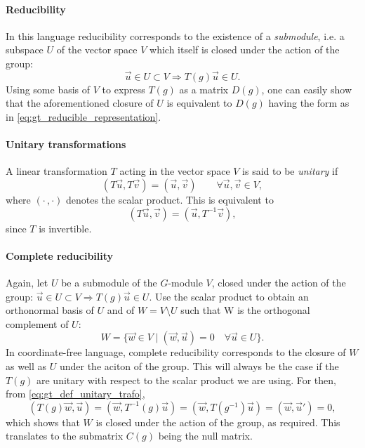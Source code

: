 \documentclass[../../main.tex]{subfiles}
\begin{document}
\paragraph{Reducibility}
In this language reducibility corresponds to the existence of a \emph{submodule}, i.e. a subspace $U$ of the vector space $V$ which itself is closed under the action of the group:
\begin{equation}
    \vec u \in U \subset V \Rightarrow T(g)\vec u \in U .
\end{equation}
Using some basis of $V$ to express $T(g)$ as a matrix $D(g)$, one can easily show that the aforementioned closure of $U$ is equivalent to $D(g)$ having the form as in \cref{eq:gt_reducible_representation}.

\paragraph{Unitary transformations}
A linear transformation $T$ acting in the vector space $V$ is said to be \emph{unitary} if
\begin{equation}
    (T\vec u, T \vec v) = (\vec u, \vec v) \qquad \forall\vec u, \vec v \in V ,
\end{equation}
where $(\cdot\, , \cdot)$ denotes the scalar product. This is equivalent to
\begin{equation}
    (T\vec u, \vec v) = (\vec u, T^{-1} \vec v) , \label{eq:gt_def_unitary_trafo}
\end{equation} 
since $T$ is invertible. 

\paragraph{Complete reducibility}
Again, let $U$ be a submodule of the $G$-module $V$, closed under the action of the group: $\vec u \in U \subset V \Rightarrow T(g)\vec u \in U$. Use the scalar product to obtain an orthonormal basis of $U$ and of $W = V \setminus U$ such that W is the orthogonal complement of $U$:
\begin{equation}
    W = \{\vec w \in V \mid (\vec w, \vec u) = 0 \quad \forall \vec u \in U \}.
\end{equation}
In coordinate-free language, complete reducibility corresponds to the closure of $W$ as well as $U$ under the aciton of the group. This will always be the case if the $T(g)$ are unitary with respect to the scalar product we are using. For then, from \cref{eq:gt_def_unitary_trafo},
\begin{equation*}
    (T(g)\vec w, \vec u) = (\vec w, T^{-1}(g) \vec u) = (\vec w, T(g^{-1}) \vec u) = (\vec w, \vec u') = 0 ,
\end{equation*}
which shows that $W$ is closed under the action of the group, as required. This translates to the submatrix $C(g)$ being the null matrix.
\end{document}
